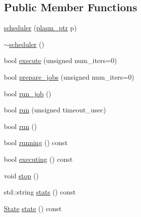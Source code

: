 \subsection*{Public Member Functions}
\begin{DoxyCompactItemize}
\item 
\hyperlink{classecto_1_1scheduler_a3a2999bde52bfacfc194243ef2ae4f89}{scheduler} (\hyperlink{namespaceecto_a6b83be6cd685db71f03b14871653475f}{plasm\-\_\-ptr} p)
\item 
\hyperlink{classecto_1_1scheduler_aac758e34705ebab32cf66bdf42f0d89d}{$\sim$scheduler} ()
\item 
bool \hyperlink{classecto_1_1scheduler_ad917e3fa322f0a065e306afec7284d4e}{execute} (unsigned num\-\_\-iters=0)
\item 
bool \hyperlink{classecto_1_1scheduler_a6f723a36600b0a47c9b387c460cf3d59}{prepare\-\_\-jobs} (unsigned num\-\_\-iters=0)
\item 
bool \hyperlink{classecto_1_1scheduler_a7fcfe7583c13ff5d2294242aedfa0b1a}{run\-\_\-job} ()
\item 
bool \hyperlink{classecto_1_1scheduler_a326022cba6c3154f28f9694b7c9968fd}{run} (unsigned timeout\-\_\-usec)
\item 
bool \hyperlink{classecto_1_1scheduler_a8d5ce4f97e511341f315bb7621ba38f4}{run} ()
\item 
bool \hyperlink{classecto_1_1scheduler_a99ac4b8df3d015f6a39d0cf7607cc657}{running} () const 
\item 
bool \hyperlink{classecto_1_1scheduler_a13257817e1cc6c1ce04ef0bfdabc5375}{executing} () const 
\item 
void \hyperlink{classecto_1_1scheduler_ab974783264da5c33a19110926b5565f4}{stop} ()
\item 
std\-::string \hyperlink{classecto_1_1scheduler_a99d2f51779f856b3905bb8b493f091c4}{stats} () const 
\item 
\hyperlink{classecto_1_1scheduler_a6b063d1c4bb9dad58d7ace61946b1200}{State} \hyperlink{classecto_1_1scheduler_a5497ae108416ccdf7d80fa7c8e462992}{state} () const 
\end{DoxyCompactItemize}

